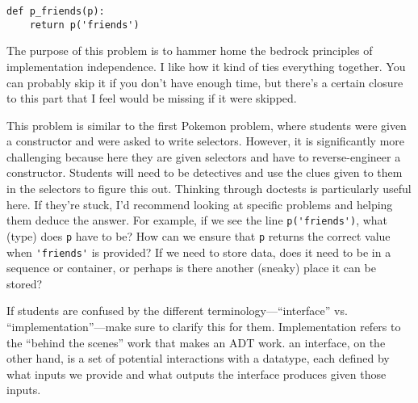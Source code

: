 \begin{parts}
\begin{blocksection}
    \begin{lstlisting}
def p_friends(p):
    return p('friends')
    \end{lstlisting}
    
    \end{blocksection}
    
    \begin{questionmeta}
        The purpose of this problem is to hammer home the bedrock principles of implementation independence. I like 
        how it kind of ties everything together. You can probably skip it if you don't have enough time, but there's a 
        certain closure to this part that I feel would be missing if it were skipped. 

        This problem is similar to the first Pokemon problem, where students were given a constructor and were
        asked to write selectors. However, it is significantly more challenging because here they are given
        selectors and have to reverse-engineer a constructor. Students will need to be detectives and use
        the clues given to them in the selectors to figure this out. Thinking through doctests is particularly useful here.
        If they're stuck, I'd recommend looking at specific problems and helping them deduce the answer. For example, 
        if we see the line \lstinline{p('friends')}, what (type) does \lstinline{p} have to be? How can we ensure that \lstinline{p} returns the correct value when
        \lstinline{'friends'} is provided? If we need to store data, does it need to be in a sequence or container,
        or perhaps is there another (sneaky) place it can be stored? 

        If students are confused by the different terminology---``interface'' vs. ``implementation''---make sure to
        clarify this for them. Implementation refers to the ``behind the scenes'' work that makes an ADT work. an
        interface, on the other hand, is a set of potential interactions with a datatype, each defined by
        what inputs we provide and what outputs the interface produces given those inputs. 
    \end{questionmeta}



\end{parts}
